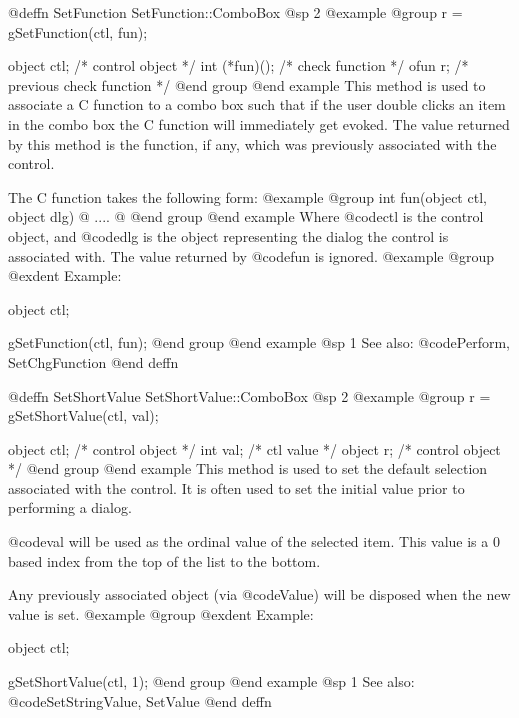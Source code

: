 @deffn {SetFunction} SetFunction::ComboBox
@sp 2
@example
@group
r = gSetFunction(ctl, fun);

object  ctl;      /*  control object           */
int     (*fun)(); /*  check function           */
ofun    r;        /*  previous check function  */
@end group
@end example
This method is used to associate a C function to a combo box such that if
the user double clicks an item in the combo box the C function will
immediately get evoked.  The value returned by this method is the
function, if any, which was previously associated with the control.

The C function takes the following form:
@example
@group
int     fun(object ctl, object dlg)
@{
        ....
@}
@end group
@end example
Where @code{ctl} is the control object, and @code{dlg} is the object
representing the dialog the control is associated with.  The value
returned by @code{fun} is ignored.
@example
@group
@exdent Example:

object  ctl;

gSetFunction(ctl, fun);
@end group
@end example
@sp 1
See also:  @code{Perform, SetChgFunction}
@end deffn






















@deffn {SetShortValue} SetShortValue::ComboBox
@sp 2
@example
@group
r = gSetShortValue(ctl, val);

object  ctl;    /*  control object  */
int     val;    /*  ctl value       */
object  r;      /*  control object  */
@end group
@end example
This method is used to set the default selection associated with the
control.  It is often used to set the initial value prior to performing
a dialog.

@code{val} will be used as the ordinal value of the selected item.  This
value is a 0 based index from the top of the list to the bottom.

Any previously associated object (via @code{Value}) will be disposed
when the new value is set.
@example
@group
@exdent Example:

object  ctl;

gSetShortValue(ctl, 1);
@end group
@end example
@sp 1
See also:  @code{SetStringValue, SetValue}
@end deffn









